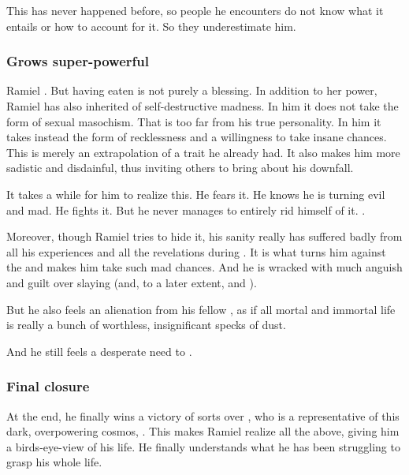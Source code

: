 This has never happened before, so people he encounters do not know what it entails or how to account for it. 
So they underestimate him. 





\subsubsection{Grows super-powerful}
Ramiel .
But having eaten \Shiaraid is not purely a blessing. 
In addition to her power, Ramiel has also inherited  of self-destructive madness. 
In him it does not take the form of sexual masochism. 
That is too far from his true personality. 
In him it takes instead the form of recklessness and a willingness to take insane chances. 
This is merely an extrapolation of a trait he already had. 
It also makes him more sadistic and disdainful, thus inviting others to bring about his downfall. 

It takes a while for him to realize this. 
He fears it. 
He knows he is turning evil and mad. 
He fights it. 
But he never manages to entirely rid himself of it. 
.

Moreover, though Ramiel tries to hide it, his sanity really has suffered badly from all his experiences and all the revelations during .
It is what turns him against the \banes and makes him take such mad chances.
And he is wracked with much anguish and guilt over slaying  (and, to a later extent,  and ).

But he also feels an alienation from his fellow \resphain, as if all mortal and immortal life is really a bunch of worthless, insignificant specks of dust.

And he still feels a desperate need to .






\subsubsection{Final closure}
At the end, he finally wins a victory of sorts over \Daggerrain, who is a representative of this dark, overpowering cosmos, . 
This makes Ramiel realize all the above, giving him a birds-eye-view of his life. 
He finally understands what he has been struggling to grasp his whole life. 

